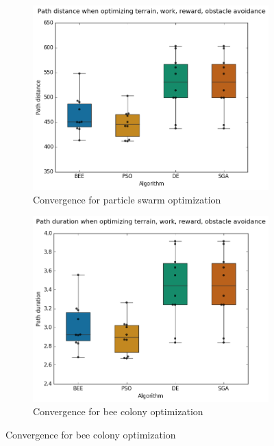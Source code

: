 \documentclass{tamuccthesis}
\begin{document}
\begin{figure}
    \captionsetup{justification=centering}
    \centering
    \begin{subfigure}[b]{0.475\textwidth}
        \centering
        \includegraphics[width=\textwidth]{EXP3_histo_distance_b.png}
        \caption[]{{\small Convergence for particle swarm optimization}}
        \label{fig:algcompare_b_distance}
    \end{subfigure}
    \hfill
    \begin{subfigure}[b]{0.475\textwidth}  
        \centering 
        \includegraphics[width=\textwidth]{EXP3_histo_duration_b.png}
        \caption[]{{\small Convergence for bee colony optimization }}

\end{subfigure}
\end{figure}
\end{document}
